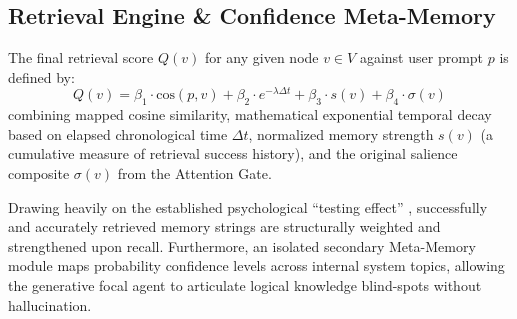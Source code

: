 \documentclass[conference]{IEEEtran}
\begin{document}
\subsection{Retrieval Engine \& Confidence Meta-Memory}
The final retrieval score $Q(v)$ for any given node $v \in V$ against user prompt $p$ is defined by:
\begin{equation}
Q(v) = \beta_1 \cdot \text{cos}(p, v) + \beta_2 \cdot e^{-\lambda \Delta t} + \beta_3 \cdot s(v) + \beta_4 \cdot \sigma(v)
\end{equation}
combining mapped cosine similarity, mathematical exponential temporal decay based on elapsed chronological time $\Delta t$, normalized memory strength $s(v)$ (a cumulative measure of retrieval success history), and the original salience composite $\sigma(v)$ from the Attention Gate.

Drawing heavily on the established psychological ``testing effect'' \cite{roediger2006test}, successfully and accurately retrieved memory strings are structurally weighted and strengthened upon recall. Furthermore, an isolated secondary Meta-Memory module maps probability confidence levels across internal system topics, allowing the generative focal agent to articulate logical knowledge blind-spots without hallucination.
\end{document}
